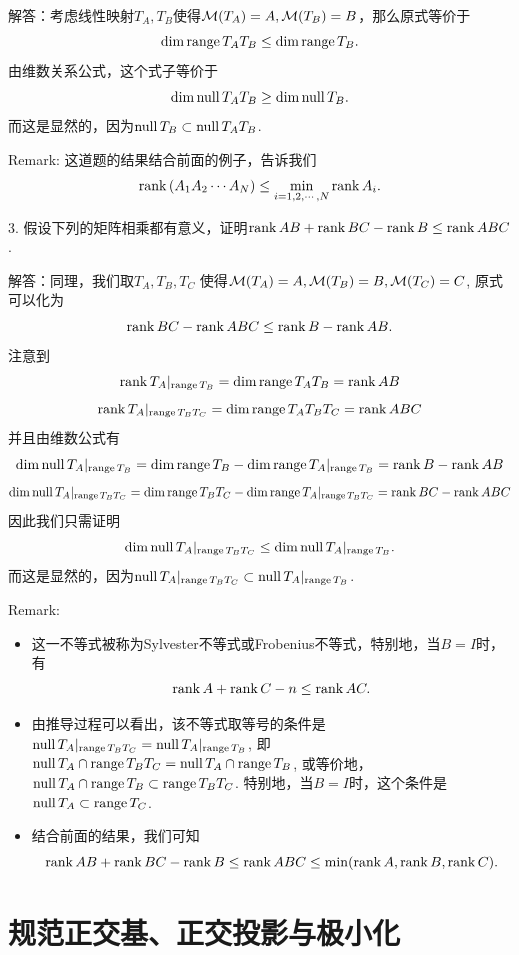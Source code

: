\documentclass[hyperref,]{ctexart}
\providecommand{\tightlist}{%
  \setlength{\itemsep}{0pt}\setlength{\parskip}{0pt}}
\begin{document}
\noindent{}
解答：考虑线性映射\(T_A,T_B\)使得\(\mathcal{M}(T_A) =A,\mathcal{M}(T_B)=B\)，那么原式等价于
\[\mathrm{dim}\,\mathrm{range}\, T_AT_B \le \mathrm{dim}\, \mathrm{range}\, T_B.\]
由维数关系公式，这个式子等价于 \[\mathrm{dim}\, \mathrm{null}\, T_AT_B \ge \mathrm{dim}\, \mathrm{null}\, T_B.\]
而这是显然的，因为\(\mathrm{null}\, T_B\subset \mathrm{null}\, T_AT_B\).

\smallskip

\noindent{} Remark: 这道题的结果结合前面的例子，告诉我们
\[\mathrm{rank}\, (A_1A_2\cdots A_N)\le \min_{i=1,2,\cdots,N}\mathrm{rank}\, A_i.\]

\bigskip

\noindent{} 3.
假设下列的矩阵相乘都有意义，证明\(\mathrm{rank}\, AB+\mathrm{rank}\, BC-\mathrm{rank}\, B\le \mathrm{rank}\, ABC\).

\smallskip 

\noindent{} 解答：同理，我们取\(T_A, T_B, T_C\)
使得\(\mathcal{M}(T_A) = A, \mathcal{M}(T_B)=B, \mathcal{M}(T_C)=C\), 原式可以化为
\[\mathrm{rank}\, BC -\mathrm{rank}\, ABC \le \mathrm{rank}\, B-\mathrm{rank}\, AB.\] 注意到
\[\mathrm{rank}\, T_A|_{\mathrm{range}\, T_B}=\mathrm{dim}\, \mathrm{range}\, T_AT_B = \mathrm{rank}\, AB\]
\[\mathrm{rank}\, T_A|_{\mathrm{range}\, T_BT_C}=\mathrm{dim}\, \mathrm{range}\, T_AT_BT_C = \mathrm{rank}\, ABC\]
并且由维数公式有
\[\mathrm{dim}\, \mathrm{null}\, T_A|_{\mathrm{range}\, T_B} = \mathrm{dim}\, \mathrm{range}\, T_B - \mathrm{dim}\,\mathrm{range}\, T_A|_{\mathrm{range}\, T_B} =\mathrm{rank}\, B-\mathrm{rank}\, AB\]
\[\mathrm{dim}\, \mathrm{null}\, T_A|_{\mathrm{range}\, T_BT_C} = \mathrm{dim}\, \mathrm{range}\, T_BT_C - \mathrm{dim}\,\mathrm{range}\, T_A|_{\mathrm{range}\, T_BT_C} =\mathrm{rank}\, BC-\mathrm{rank}\, ABC\]
因此我们只需证明
\[\mathrm{dim}\, \mathrm{null}\, T_A|_{\mathrm{range}\, T_BT_C} \le \mathrm{dim}\, \mathrm{null}\, T_A|_{\mathrm{range}\, T_B}.\]
而这是显然的，因为\(\mathrm{null}\, T_A|_{\mathrm{range}\, T_BT_C}\subset \mathrm{null}\, T_A|_{\mathrm{range}\, T_B}\).

\noindent{} Remark:

\begin{itemize}
\tightlist
\item
  这一不等式被称为Sylvester不等式或Frobenius不等式，特别地，当\(B=I\)时，有
  \[\mathrm{rank}\, A+\mathrm{rank}\, C -n\le \mathrm{rank}\, AC.\]
\item
  由推导过程可以看出，该不等式取等号的条件是\(\mathrm{null}\, T_A|_{\mathrm{range}\, T_BT_C}= \mathrm{null}\, T_A|_{\mathrm{range}\, T_B}\),
  即\(\mathrm{null}\, T_A\cap\mathrm{range}\, T_BT_C = \mathrm{null}\, T_A\cap \mathrm{range}\, T_B\),
  或等价地，\(\mathrm{null}\, T_A \cap \mathrm{range}\, T_B\subset \mathrm{range}\, T_BT_C\).
  特别地，当\(B=I\)时，这个条件是\(\mathrm{null}\, T_A\subset \mathrm{range}\, T_C\).
\item
  结合前面的结果，我们可知
  \[\mathrm{rank}\, AB+\mathrm{rank}\, BC-\mathrm{rank}\, B\le \mathrm{rank}\, ABC\le \min(\mathrm{rank}\, A,\mathrm{rank}\, B,\mathrm{rank}\, C).\]
\end{itemize}

\section{规范正交基、正交投影与极小化}\label{ux89c4ux8303ux6b63ux4ea4ux57faux6b63ux4ea4ux6295ux5f71ux4e0eux6781ux5c0fux5316}
\end{document}
